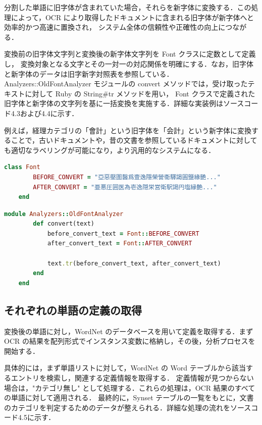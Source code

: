 分割した単語に旧字体が含まれていた場合，それらを新字体に変換する．この処理によって，OCR により取得したドキュメントに含まれる旧字体が新字体へと効率的かつ高速に置換され，
システム全体の信頼性や正確性の向上につながる．

変換前の旧字体文字列と変換後の新字体文字列を Font クラスに定数として定義し，
変換対象となる文字とその一対一の対応関係を明確にする．なお，旧字体と新字体のデータは旧字新字対照表を参照している\cite{kanji}．
Analyzers::OldFontAnalyzer モジュールの convert メソッドでは，受け取ったテキストに対して Ruby の String\#tr メソッドを用い，
Font クラスで定義された旧字体と新字体の文字列を基に一括変換を実施する．詳細な実装例はソースコード4.3および4.4に示す．

例えば，経理カテゴリの「會計」という旧字体を「会計」という新字体に変換することで，古いドキュメントや，昔の文書を参照しているドキュメントに対しても適切なラベリングが可能になり，より汎用的なシステムになる．

\begin{lstlisting}[language=Ruby, caption=Font クラスの定義]
    class Font
        BEFORE_CONVERT = "亞惡壓圍醫爲壹逸隱榮營衞驛謁圓鹽緣艷..."
        AFTER_CONVERT = "亜悪圧囲医為壱逸隠栄営衛駅謁円塩縁艶..."
    end
\end{lstlisting}

\begin{lstlisting}[language=Ruby, caption=新字体への変換]
    module Analyzers::OldFontAnalyzer
        def convert(text)
            before_convert_text = Font::BEFORE_CONVERT
            after_convert_text = Font::AFTER_CONVERT

            text.tr(before_convert_text, after_convert_text)
        end
    end
\end{lstlisting}

\clearpage

\subsection{それぞれの単語の定義の取得}
\label{subsec:app_synset}

変換後の単語に対し，WordNet のデータベースを用いて定義を取得する．まず OCR の結果を配列形式でインスタンス変数に格納し，その後，分析プロセスを開始する．

具体的には，まず単語リストに対して，WordNet の Word テーブルから該当するエントリを検索し，関連する定義情報を取得する．
定義情報が見つからない場合は，"カテゴリ無し" として処理する．これらの処理は，OCR 結果のすべての単語に対して適用される．
最終的に，Synset テーブルの一覧をもとに，文書のカテゴリを判定するためのデータが整えられる．詳細な処理の流れをソースコード4.5に示す．

